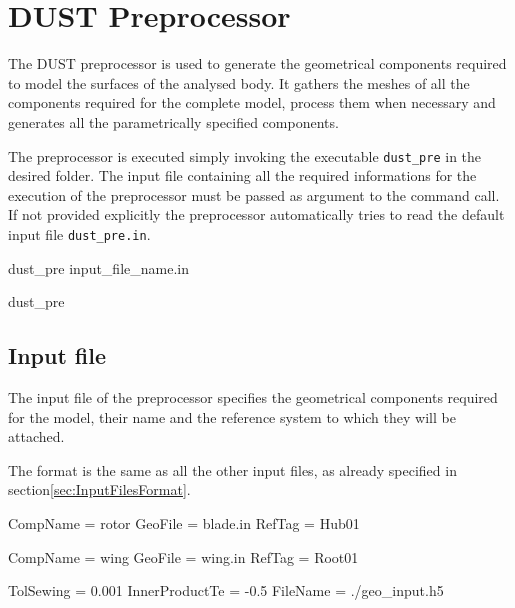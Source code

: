 \chapter{DUST Preprocessor}
\label{ch:Pre}

The DUST preprocessor is used to generate the geometrical components required to model the surfaces of the analysed body. It gathers the meshes of all the components required for the complete model, process them when necessary and generates all the parametrically specified components. 

The preprocessor is executed simply invoking the executable \texttt{dust\_pre} in the desired folder. The input file containing all the required informations for the execution of the preprocessor must be passed as argument to the command call. If not provided explicitly the preprocessor automatically tries to read the default input file \texttt{dust\_pre.in}.
\begin{command}[caption={Preprocessor command looking for input file \texttt{input\_file\_name.in}}]
 dust_pre input_file_name.in
\end{command}

\begin{command}[caption={Preprocessor command looking for 
default input file \texttt{dust\_pre.in}}, label={command:dus_pre_default}]
 dust_pre
\end{command}


\section{Input file}
\label{sec:Pre_InputFile}

The input file of the preprocessor specifies the geometrical components required for the model, their name and the reference system to which they will be attached.

The format is the same as all the other input files, as already specified in section\ref{sec:InputFilesFormat}.

\begin{inputfile}[frame=single, caption={dust\_pre.in}, label={file:dust_pre.in}]
CompName = rotor
GeoFile  = blade.in
RefTag   = Hub01

CompName = wing
GeoFile  = wing.in
RefTag   = Root01

TolSewing  = 0.001
InnerProductTe = -0.5
FileName = ./geo_input.h5 
\end{inputfile}

